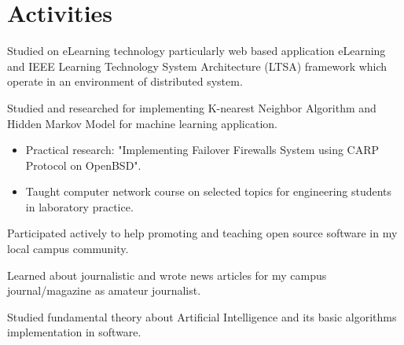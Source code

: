 \documentclass[10pt, a4paper]{moderncv}
\begin{document}
\section{Activities}
{
    \begin{scriptsize}
        Studied on eLearning technology particularly web based application eLearning and IEEE Learning Technology System Architecture (LTSA) framework
        which operate in an environment of distributed system.
    \end{scriptsize}
}
{
    \begin{scriptsize}
        Studied and researched for implementing K-nearest Neighbor Algorithm and Hidden Markov Model for machine learning application.
    \end{scriptsize}
}
{
    \begin{itemize}
        \item Practical research: "Implementing Failover Firewalls System using CARP Protocol on OpenBSD".
        \item Taught computer network course on selected topics for engineering students in laboratory practice.
    \end{itemize}
}
{
    \begin{scriptsize}
        Participated actively to help promoting and teaching open source software in my local campus community.
    \end{scriptsize}
}
{
    \begin{scriptsize}
        Learned about journalistic and wrote news articles for my campus journal/magazine as amateur journalist.
    \end{scriptsize}
}
{
    \begin{scriptsize}
        Studied fundamental theory about Artificial Intelligence and its basic algorithms implementation in software.
    \end{scriptsize}
}
\end{document}
